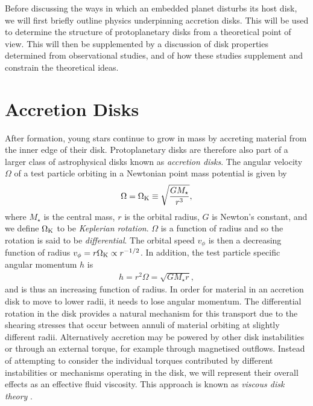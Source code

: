Before discussing the ways in which an embedded planet disturbs its host disk, we will first briefly outline physics underpinning accretion disks.
This will be used to determine the structure of protoplanetary disks from a theoretical point of view.
This will then be supplemented by a discussion of disk properties determined from observational studies, and of how these studies supplement and
constrain the theoretical ideas.

\section{Accretion Disks}

After formation, young stars continue to grow in mass by accreting material from the inner edge of their disk.
Protoplanetary disks are therefore also part of a larger class of astrophysical disks known as \textit{accretion disks}.
The angular velocity $\Omega$ of a test particle orbiting in a Newtonian point mass potential is given by
\begin{align}
    \Omega = \Omega_{\rm K} \equiv \sqrt{\frac{G M_\star}{r^3}}, \label{eq:point_pot}
\end{align}
where $M_\star$ is the central mass, $r$ is the orbital radius, $G$ is Newton's constant, and we  define $\Omega_{\rm K}$ to be \textit{Keplerian rotation}.
$\Omega$ is a function of radius and so the rotation is said to be \textit{differential}.
The orbital speed $v_\phi$ is then a decreasing function of radius $v_\phi = r \Omega_{\rm K} \propto r^{-1/2}$.
In addition, the test particle specific angular momentum $h$ is
\begin{align}
    h = r^2 \Omega = \sqrt{G M_\star r}, \label{eq:ang_mom}
\end{align}
and is thus an increasing function of radius.
In order for material in an accretion disk to move to lower radii, it needs to lose angular momentum.
The differential rotation in the disk provides a natural mechanism for this transport due to the shearing stresses that occur between annuli of material orbiting at slightly different radii.
Alternatively accretion may be powered by other disk instabilities or through an external torque, for example through magnetised outflows.
Instead of attempting to consider the individual torques contributed by different instabilities or mechanisms operating in the disk, we will represent their overall effects as an effective fluid viscosity.
This approach is known as \textit{viscous disk theory} \citep{lynden-bell1974,shakura1973}.

